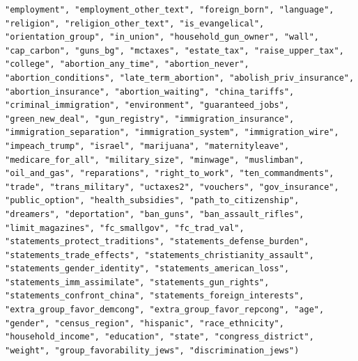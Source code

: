 \documentclass[
]{article}
\begin{document}
\begin{verbatim}
"employment", "employment_other_text", "foreign_born", "language", "religion", "religion_other_text", "is_evangelical", "orientation_group", "in_union", "household_gun_owner", "wall", "cap_carbon", "guns_bg", "mctaxes", "estate_tax", "raise_upper_tax", "college", "abortion_any_time", "abortion_never", "abortion_conditions", "late_term_abortion", "abolish_priv_insurance", "abortion_insurance", "abortion_waiting", "china_tariffs", "criminal_immigration", "environment", "guaranteed_jobs", "green_new_deal", "gun_registry", "immigration_insurance", "immigration_separation", "immigration_system", "immigration_wire", "impeach_trump", "israel", "marijuana", "maternityleave", "medicare_for_all", "military_size", "minwage", "muslimban", "oil_and_gas", "reparations", "right_to_work", "ten_commandments", "trade", "trans_military", "uctaxes2", "vouchers", "gov_insurance", "public_option", "health_subsidies", "path_to_citizenship", "dreamers", "deportation", "ban_guns", "ban_assault_rifles", "limit_magazines", "fc_smallgov", "fc_trad_val", "statements_protect_traditions", "statements_defense_burden", "statements_trade_effects", "statements_christianity_assault", "statements_gender_identity", "statements_american_loss", "statements_imm_assimilate", "statements_gun_rights", "statements_confront_china", "statements_foreign_interests", "extra_group_favor_demcong", "extra_group_favor_repcong", "age", "gender", "census_region", "hispanic", "race_ethnicity", "household_income", "education", "state", "congress_district", "weight", "group_favorability_jews", "discrimination_jews")
\end{verbatim}
\end{document}
